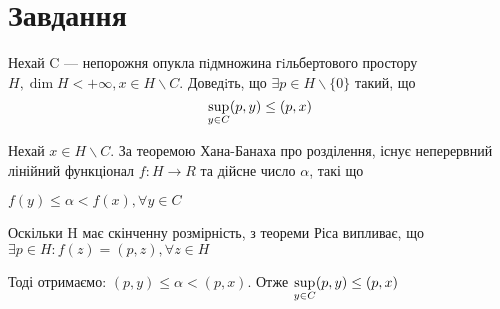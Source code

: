 
\chapter{Завдання \theHchapter}


\begin{tcolorbox}[title=Завдання]
    
    Нехай C — непорожня опукла пiдмножина гiльбертового 
    простору $ H, \dim H < + \infty, x \in H \backslash C $.
    Доведiть, що $ \exists p \in H \backslash \{0\} $ такий, що
    $$ \displaystyle\sup_{y \in C} (p, y) \le (p, x) $$

    
\end{tcolorbox}


Нехай $x \in H  \backslash C$. За теоремою Хана-Банаха про розділення, 
існує неперервний лінійний функціонал $f: H \rightarrow R$ та дійсне число
$\alpha$, такі що 


$ f(y) \le \alpha < f(x), \forall y \in C $



Оскільки H має скінченну розмірність, з теореми Ріса випливає, що 
$ \exists p \in H : f(z)= (p, z), \forall z \in H $


Тоді отримаємо: $(p, y) \le \alpha < (p, x)$.
Отже $ \displaystyle\sup_{y \in C} (p, y) \le (p, x) $
